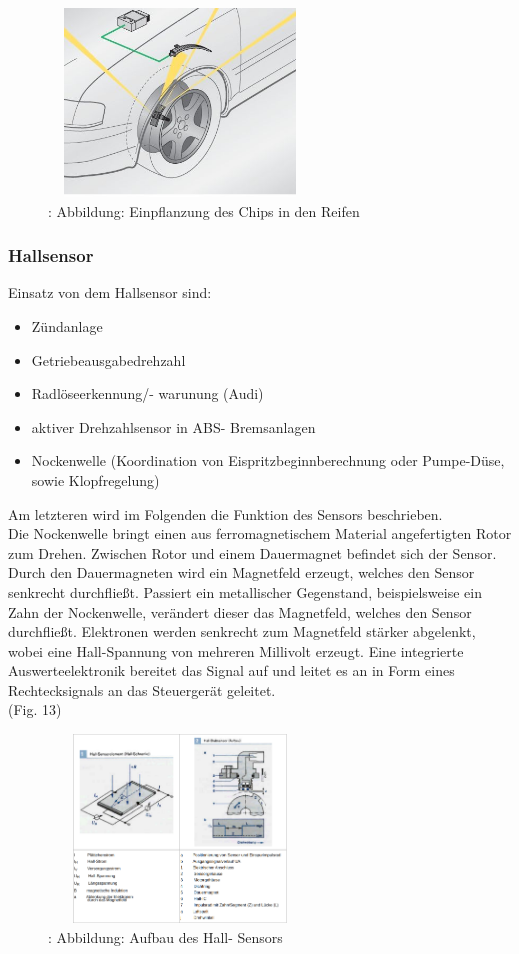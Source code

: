 	\begin{figure}
		\centering
		\includegraphics[width=7cm, height=5cm] {rdks.png}
		\caption {\cite{TS_rdks_pic}: Abbildung: Einpflanzung des Chips in den Reifen}
	\end{figure}
	
	\subsubsection{Hallsensor}
	Einsatz von dem Hallsensor sind: 
	\begin{itemize}
		\item Zündanlage
		\item Getriebeausgabedrehzahl
		\item Radlöseerkennung/- warunung (Audi)
		\item aktiver Drehzahlsensor in ABS- Bremsanlagen
		\item Nockenwelle (Koordination von Eispritzbeginnberechnung oder Pumpe-Düse, sowie Klopfregelung)
	\end{itemize}
	
	Am letzteren wird im Folgenden die Funktion des Sensors beschrieben.\\
	Die Nockenwelle bringt einen aus ferromagnetischem Material angefertigten Rotor zum Drehen. Zwischen Rotor und einem Dauermagnet befindet sich der Sensor. Durch den Dauermagneten wird ein Magnetfeld erzeugt, welches den Sensor senkrecht durchfließt. Passiert ein metallischer Gegenstand, beispielsweise ein Zahn der Nockenwelle, verändert dieser das Magnetfeld, welches den Sensor durchfließt.
	Elektronen werden senkrecht zum Magnetfeld stärker abgelenkt, wobei eine Hall-Spannung von mehreren Millivolt erzeugt. Eine integrierte Auswerteelektronik bereitet das Signal auf und leitet es an in Form eines Rechtecksignals an das Steuergerät geleitet.\\\cite{TS_hall}
	(Fig. 13)
	\begin{figure}
		\centering
		\includegraphics[width=7cm, height=5cm] {hall.png}
		\caption {\cite{TS_hall_pic}: Abbildung: Aufbau des Hall- Sensors}
	\end{figure}
	
